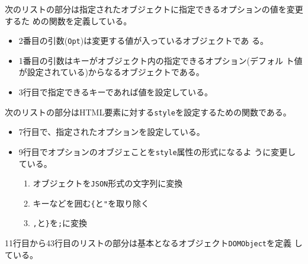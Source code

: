 次のリストの部分は指定されたオブジェクトに指定できるオプションの値を変更するた
 めの関数を定義している。
\begin{itemize}
 \item 2番目の引数(\texttt{Opt})は変更する値が入っているオブジェクトであ
       る。
 \item 1番目の引数はキーがオブジェクト内の指定できるオプション(デフォル
       ト値が設定されている)からなるオブジェクトである。
 \item 3行目で指定できるキーであれば値を設定している。
\end{itemize}
次のリストの部分はHTML要素に対する\texttt{style}を設定するための関数である。
\begin{itemize}
 \item 7行目で、指定されたオプションを設定している。
 \item 9行目でオプションのオブジェことを\texttt{style}属性の形式になるよ
       うに変更している。
\begin{enumerate}
 \item オブジェクトを\texttt{JSON}形式の文字列に変換
 \item キーなどを囲む\texttt{\{}と\texttt{"}を取り除く%
 \item \texttt{,}と\texttt{\}}を\texttt{;}に変換
\end{enumerate}
\end{itemize}
11行目から43行目のリストの部分は基本となるオブジェクト\texttt{DOMObject}を定義
している。
